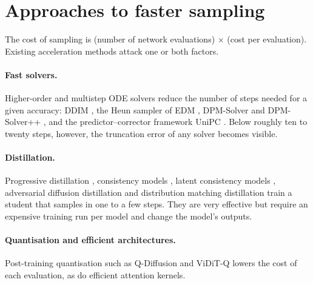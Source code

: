 \section{Approaches to faster sampling}\label{sec:lit-accel}

The cost of sampling is (number of network evaluations) $\times$ (cost per evaluation). Existing acceleration methods attack one or both factors.

\paragraph{Fast solvers.} Higher-order and multistep ODE solvers reduce the number of steps needed for a given accuracy: DDIM \citep{song2021ddim}, the Heun sampler of EDM \citep{karras2022edm}, DPM-Solver and DPM-Solver++ \citep{lu2022dpmsolver,lu2025dpmsolverpp}, and the predictor--corrector framework UniPC \citep{zhao2023unipc}. Below roughly ten to twenty steps, however, the truncation error of any solver becomes visible.

\paragraph{Distillation.} Progressive distillation \citep{salimans2022progressive}, consistency models \citep{song2023consistency}, latent consistency models \citep{luo2023lcm}, adversarial diffusion distillation \citep{sauer2024add} and distribution matching distillation \citep{yin2024dmd} train a student that samples in one to a few steps. They are very effective but require an expensive training run per model and change the model's outputs.

\paragraph{Quantisation and efficient architectures.} Post-training quantisation such as Q-Diffusion \citep{li2023qdiffusion} and ViDiT-Q \citep{zhao2024viditq} lowers the cost of each evaluation, as do efficient attention kernels.

